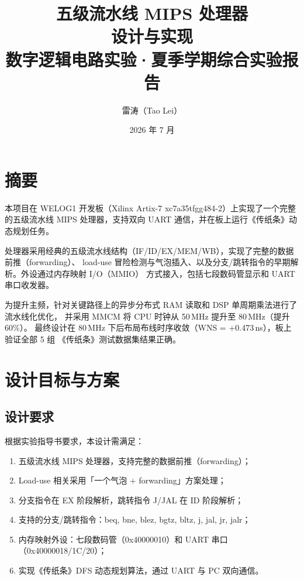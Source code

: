 \documentclass[12pt,a4paper]{ctexart}
\title{{\Huge 五级流水线 MIPS 处理器\\[4pt] 设计与实现}\\[8pt]
       {\large 数字逻辑电路实验·夏季学期综合实验报告}}
\author{雷涛（Tao Lei）}
\date{2026 年 7 月}
\begin{document}
\maketitle
\thispagestyle{empty}

\section{摘要}

本项目在 WELOG1 开发板（Xilinx Artix-7 xc7a35tfgg484-2）上实现了一个完整的五级流水线
MIPS 处理器，支持双向 UART 通信，并在板上运行《传纸条》动态规划任务。

处理器采用经典的五级流水线结构（IF/ID/EX/MEM/WB），实现了完整的数据前推（forwarding）、
load-use 冒险检测与气泡插入、以及分支/跳转指令的早期解析。外设通过内存映射 I/O（MMIO）
方式接入，包括七段数码管显示和 UART 串口收发器。

为提升主频，针对关键路径上的异步分布式 RAM 读取和 DSP 单周期乘法进行了流水线化优化，
并采用 MMCM 将 CPU 时钟从 50\,MHz 提升至 80\,MHz（提升 60\%）。
最终设计在 80\,MHz 下后布局布线时序收敛（WNS = +0.473\,ns），板上验证全部 5 组
《传纸条》测试数据集结果正确。

\section{设计目标与方案}

\subsection{设计要求}

根据实验指导书要求，本设计需满足：
\begin{enumerate}[nosep]
  \item 五级流水线 MIPS 处理器，支持完整的数据前推（forwarding）；
  \item Load-use 相关采用「一个气泡 + forwarding」方案处理；
  \item 分支指令在 EX 阶段解析，跳转指令 J/JAL 在 ID 阶段解析；
  \item 支持的分支/跳转指令：beq, bne, blez, bgtz, bltz, j, jal, jr, jalr；
  \item 内存映射外设：七段数码管（0x40000010）和 UART 串口（0x40000018/1C/20）；
  \item 实现《传纸条》DFS 动态规划算法，通过 UART 与 PC 双向通信。
\end{enumerate}
\end{document}
